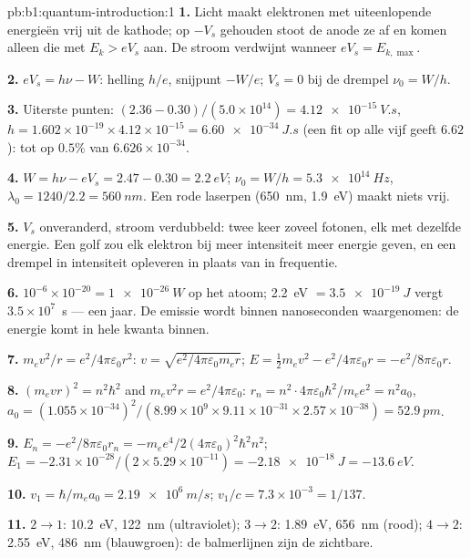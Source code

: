 \begin{solution}{pb:b1:quantum-introduction:1}
\textbf{1.} Licht maakt elektronen met uiteenlopende energieën vrij uit de
kathode; op $-V_s$ gehouden stoot de anode ze af en komen alleen die met
$E_k > eV_s$ aan. De stroom verdwijnt wanneer $eV_s = E_{k,\max}$.

\textbf{2.} $eV_s = h\nu - W$: helling $h/e$, snijpunt $-W/e$; $V_s = 0$ bij
de drempel $\nu_0 = W/h$.

\textbf{3.} Uiterste punten: $(2.36 - 0.30)/(5.0 \times 10^{14}) = \qty{4.12e-15}{V.s}$,
$h = 1.602 \times 10^{-19} \times 4.12 \times 10^{-15} = \qty{6.60e-34}{J.s}$ (een fit op
alle vijf geeft $6.62$): tot op $0.5\%$ van $6.626 \times 10^{-34}$.

\textbf{4.} $W = h\nu - eV_s = 2.47 - 0.30 = \qty{2.2}{eV}$; $\nu_0 = W/h =
\qty{5.3e14}{Hz}$, $\lambda_0 = 1240/2.2 = \qty{560}{nm}$. Een rode laserpen
(\qty{650}{nm}, \qty{1.9}{eV}) maakt niets vrij.

\textbf{5.} $V_s$ onveranderd, stroom verdubbeld: twee keer zoveel fotonen, elk met
dezelfde energie. Een golf zou elk elektron bij meer intensiteit meer energie geven,
en een drempel in intensiteit opleveren in plaats van in frequentie.

\textbf{6.} $10^{-6} \times 10^{-20} = \qty{1e-26}{W}$ op het atoom; \qty{2.2}{eV} $=
\qty{3.5e-19}{J}$ vergt $3.5 \times 10^7$~s --- een jaar. De emissie wordt binnen
nanoseconden waargenomen: de energie komt in hele kwanta binnen.

\textbf{7.} $m_ev^2/r = e^2/4\pi\varepsilon_0r^2$: $v = \sqrt{e^2/4\pi\varepsilon_0m_er}$; $E =
\tfrac12m_ev^2 - e^2/4\pi\varepsilon_0r = -e^2/8\pi\varepsilon_0r$.

\textbf{8.} $(m_evr)^2 = n^2\hbar^2$ and $m_ev^2r = e^2/4\pi\varepsilon_0$: $r_n = n^2 \cdot
4\pi\varepsilon_0\hbar^2/m_ee^2 = n^2a_0$, $a_0 = (1.055 \times 10^{-34})^2/(8.99 \times 10^9
\times 9.11 \times 10^{-31} \times 2.57 \times 10^{-38}) = \qty{52.9}{pm}$.

\textbf{9.} $E_n = -e^2/8\pi\varepsilon_0r_n = -m_ee^4/2(4\pi\varepsilon_0)^2\hbar^2n^2$; $E_1 =
-2.31 \times 10^{-28}/(2 \times 5.29 \times 10^{-11}) = \qty{-2.18e-18}{J} = \qty{-13.6}{eV}$.

\textbf{10.} $v_1 = \hbar/m_ea_0 = \qty{2.19e6}{m/s}$; $v_1/c = 7.3 \times 10^{-3} =
1/137$.

\textbf{11.} $2 \to 1$: \qty{10.2}{eV}, \qty{122}{nm} (ultraviolet); $3 \to 2$:
\qty{1.89}{eV}, \qty{656}{nm} (rood); $4 \to 2$: \qty{2.55}{eV}, \qty{486}{nm}
(blauwgroen): de balmerlijnen zijn de zichtbare.


\end{solution}
